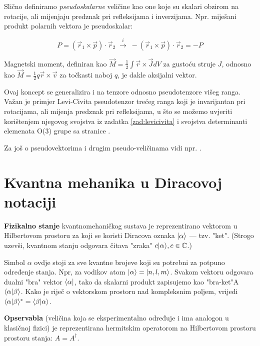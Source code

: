 \centerline{}

Slično definiramo \emph{pseudoskalarne} veličine kao one koje su skalari
obzirom na rotacije, ali mijenjaju predznak pri refleksijama i inverzijama.
Npr. miješani produkt polarnih vektora je pseudoskalar:

\[
P = (\vec{r}_1 \times \vec{p}) \cdot \vec{r}_2  \; \stackrel{i}{\longrightarrow} \;
  - (\vec{r}_1 \times \vec{p}) \cdot \vec{r}_2 = - P
\]

Magnetski moment, definiran kao $\vec{M} = \frac{1}{2} \int \vec{r}
\times \vec{J} dV$ za gustoću struje $J$, odnosno kao
$\vec{M} = \frac{1}{2} q \vec{r} \times \vec{v}$ za točkasti
naboj $q$, je dakle aksijalni vektor.

Ovaj koncept se generalizira i na tenzore odnosno pseudotenzore višeg ranga.
Važan je primjer Levi-Civita pseudotenzor trećeg ranga koji je invarijantan
pri rotacijama, ali mijenja predznak pri refleksijama, u što se možemo uvjeriti
korištenjem njegovog svojstva iz zadatka \ref{zad:levicivita} i svojstva
determinanti elemenata O(3) grupe sa stranice \pageref{pag:detO3}.

Za još o pseudovektorima i drugim pseudo-veličinama vidi
npr. \cite{Arfken:1995}.


\chapter{Kvantna mehanika u Diracovoj notaciji}
\label{sec:qm}

\textbf{Fizikalno stanje} kvantnomehaničkog sustava
je reprezentirano vektorom u Hilbertovom prostoru za
koji se koristi Diracova oznaka
 $| \alpha \rangle$ --- tzv. "ket". 
(Strogo uzevši, kvantnom stanju odgovara
čitava "zraka" $c| \alpha \rangle, c\in\mathbb{C}$.)

Simbol $\alpha$ ovdje stoji za sve kvantne brojeve koji su potrebni za potpuno
određenje stanja. Npr, za vodikov atom $| \alpha \rangle=| n,l,m \rangle$.
Svakom vektoru odgovara dualni "bra" vektor $\langle \alpha |$, tako
da skalarni produkt zapisujemo kao "bra-ket"A
$\langle \alpha |\beta \rangle$. Kako je riječ o vektorskom prostoru
nad kompleksnim poljem, vrijedi
$\langle \alpha |\beta \rangle^{*} = \langle \beta |\alpha \rangle$.

\textbf{Opservabla} (veličina koja se eksperimentalno određuje i ima
 analogon u klasičnoj fizici) je reprezentirana hermitskim operatorom na
 Hilbertovom prostoru prostoru stanja: $A=A^{\dagger}$.

